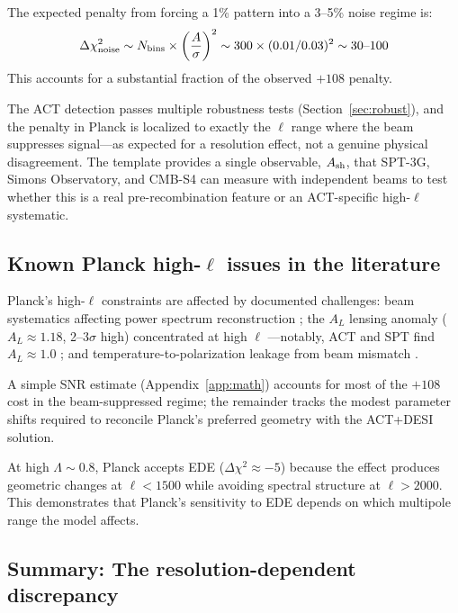 \documentclass[twocolumn,showpacs,preprintnumbers,amsmath,amssymb,prd]{revtex4-2}
\begin{document}
The expected penalty from forcing a 1\% pattern into a 3--5\% noise regime is:
\begin{equation}
\Delta\chi^2_{\rm noise} \sim N_{\rm bins} \times \left(\frac{A}{\sigma}\right)^2 
\sim 300 \times (0.01/0.03)^2 \sim 30\text{--}100
\end{equation}
This accounts for a substantial fraction of the observed $+108$ penalty.


The ACT detection passes multiple robustness tests (Section~\ref{sec:robust}), 
and the penalty in Planck is localized to exactly the $\ell$ range where the 
beam suppresses signal---as expected for a resolution effect, not a genuine 
physical disagreement. The template provides a single observable, $A_{\rm sh}$, 
that SPT-3G, Simons Observatory, and CMB-S4 can measure with independent beams 
to test whether this is a real pre-recombination feature or an ACT-specific 
high-$\ell$ systematic.

\subsection{Known Planck high-$\ell$ issues in the literature}

Planck's high-$\ell$ constraints are affected by documented challenges: beam 
systematics affecting power spectrum reconstruction \cite{Planck2013VII,Planck2016HFI,Rocha2009}; 
the $A_L$ lensing anomaly ($A_L \approx 1.18$, 2--3$\sigma$ high) concentrated at 
high $\ell$ \cite{Planck2018VI}---notably, ACT and SPT find $A_L \approx 1.0$ 
\cite{ACT2020,SPT2021}; and temperature-to-polarization leakage from beam 
mismatch \cite{Miller2009,Hivon2016,Delouis2019}.

A simple SNR estimate (Appendix~\ref{app:math}) accounts for most of the 
$+108$ cost in the beam-suppressed regime; the remainder tracks the modest 
parameter shifts required to reconcile Planck's preferred geometry with the 
ACT+DESI solution.

At high $\Lambda \sim 0.8$, Planck accepts EDE ($\Delta\chi^2 \approx -5$) 
because the effect produces geometric changes at $\ell < 1500$ while avoiding 
spectral structure at $\ell > 2000$. This demonstrates that Planck's sensitivity 
to EDE depends on which multipole range the model affects.

\subsection{Summary: The resolution-dependent discrepancy}
\end{document}
